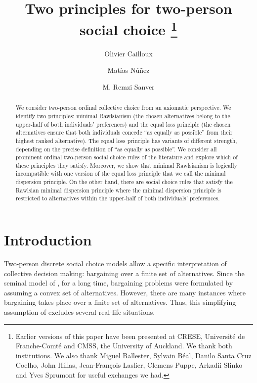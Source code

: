 \documentclass[pagesize, twoside=off, bibliography=totoc, DIV=calc, fontsize=12pt, a4paper]{scrartcl}
\title{Two principles for two-person social choice \thanks{Earlier versions of this paper have been presented at CRESE, Université de Franche-Comté and CMSS, the University of Auckland. We thank both institutions. We also thank Miguel Ballester, Sylvain Béal, Danilo Santa Cruz Coelho, John Hillas, Jean-François Laslier, Clemens Puppe, Arkadii Slinko and Yves Sprumont for useful exchanges we had.}}
\author[*]{Olivier Cailloux}
\author[**]{Matías Núñez}
\author[*]{M. Remzi Sanver}
\affil[*]{Université Paris-Dauphine, PSL Research University, CNRS, LAMSADE, 75016 PARIS, FRANCE}
\affil[**]{CREST, CNRS, École Polytechnique, GENES, ENSAE Paris, Institut Polytechnique de Paris, 91120 Palaiseau, France.}
\begin{document}
\maketitle

\begin{abstract}
    We consider two-person ordinal collective choice from an axiomatic perspective. We identify two principles: minimal Rawlsianism (the chosen alternatives belong to the upper-half of both individuals’ preferences) and the equal loss principle (the chosen alternatives ensure that both individuals concede “as equally as possible” from their highest ranked alternative). The equal loss principle has variants of different strength, depending on the precise definition of “as equally as possible”. We consider all prominent ordinal two-person social choice rules of the literature and explore which of these principles they satisfy. Moreover, we show that minimal Rawlsianism is logically incompatible with one version of the equal loss principle that we call the minimal dispersion principle. On the other hand, there are social choice rules that satisfy the Rawlsian minimal dispersion principle where the minimal dispersion principle is restricted to alternatives within the upper-half of both individuals’ preferences.
\end{abstract}

\section{Introduction}
\label{sec:intro}
Two-person discrete social choice models allow a specific interpretation of collective decision making: bargaining over a finite set of alternatives. Since the seminal model of \citet{Nash1950}, for a long time, bargaining problems were formulated by assuming a convex set of alternatives. However, there are many instances where bargaining takes place over a finite set of alternatives. Thus, this simplifying assumption of \citeauthor{Nash1950} excludes several real-life situations. 
\end{document}
